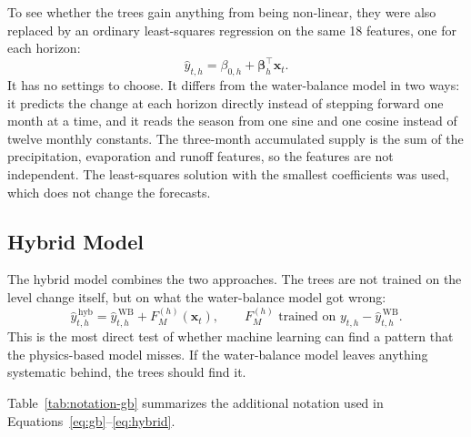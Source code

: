 \documentclass{article}
\begin{document}
To see whether the trees gain anything from being non-linear, they were also replaced by an
ordinary least-squares regression on the same 18 features, one for each horizon:
\begin{equation}
\hat y_{t,h} = \beta_{0,h} + \boldsymbol{\beta}_h^{\top} \mathbf{x}_t. \label{eq:linear}
\end{equation}
It has no settings to choose. It differs from the water-balance model in two ways: it predicts the
change at each horizon directly instead of stepping forward one month at a time, and it reads the
season from one sine and one cosine instead of twelve monthly constants. The three-month
accumulated supply is the sum of the precipitation, evaporation and runoff features, so the
features are not independent. The least-squares solution with the smallest coefficients was used,
which does not change the forecasts.

\subsection{Hybrid Model}
\label{sec:hybrid}

The hybrid model combines the two approaches. The trees are not trained on the level change
itself, but on what the water-balance model got wrong:
\begin{equation}
\hat y^{\,\mathrm{hyb}}_{t,h} = \hat y^{\,\mathrm{WB}}_{t,h} + F^{(h)}_M(\mathbf{x}_t),
\qquad F^{(h)}_M \text{ trained on } y_{t,h} - \hat y^{\,\mathrm{WB}}_{t,h}. \label{eq:hybrid}
\end{equation}
This is the most direct test of whether machine learning can find a pattern that the
physics-based model misses. If the water-balance model leaves anything systematic behind, the
trees should find it.

Table~\ref{tab:notation-gb} summarizes the additional notation used in
Equations~\ref{eq:gb}--\ref{eq:hybrid}.
\end{document}
